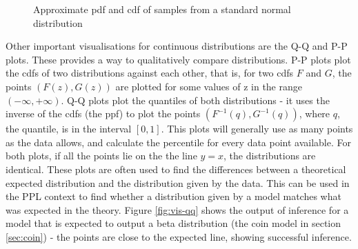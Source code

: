 \begin{figure}[!htb]
	\centering
	\qquad
	\caption{Approximate pdf and cdf of samples from a standard normal distribution}
	\label{fig:vis-norm}
\end{figure}
				
Other important visualisations for continuous distributions are the Q-Q and P-P plots. These provides a way to qualitatively compare distributions. P-P plots plot the cdfs of two distributions against each other, that is, for two cdfs $F$ and $G$, the points $(F(z), G(z))$ are plotted for some values of z in the range $(-\infty,+\infty)$. Q-Q plots plot the quantiles of both distributions - it uses the inverse of the cdfs (the ppf) to plot the points $(F^{-1}(q), G^{-1}(q))$, where $q$, the quantile, is in the interval $[0,1]$. This plots will generally use as many points as the data allows, and calculate the percentile for every data point available. For both plots, if all the points lie on the the line $y=x$, the distributions are identical. These plots are often used to find the differences between a theoretical expected distribution and the distribution given by the data. This can be used in the PPL context to find whether a distribution given by a model matches what was expected in the theory. Figure \ref{fig:vis-qq} shows the output of inference for a model that is expected to output a beta distribution (the coin model in section \ref{sec:coin}) - the points are close to the expected line, showing successful inference.
			
